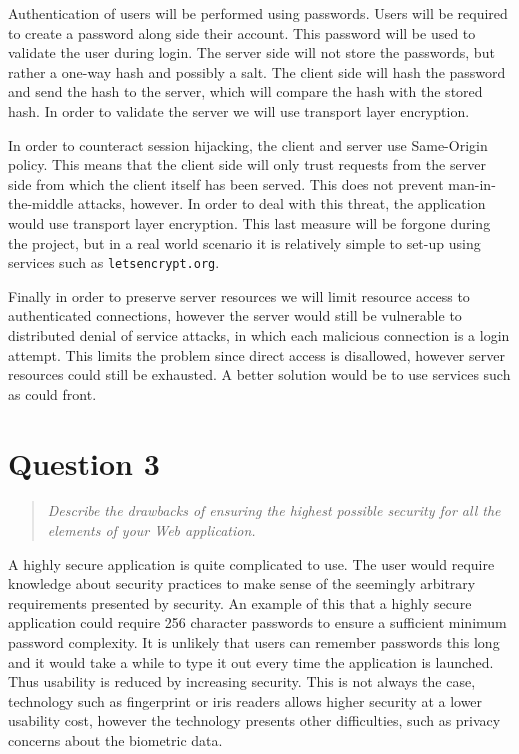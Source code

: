 \documentclass[10pt,a4paper]{report}
\begin{document}
Authentication of users will be performed using passwords. Users will be required to create a password along side their account. This password will be used to validate the user during login. The server side will not store the passwords, but rather a one-way hash and possibly a salt. The client side will hash the password and send the hash to the server, which will compare the hash with the stored hash. In order to validate the server we will use transport layer encryption.

In order to counteract session hijacking, the client and server use Same-Origin policy. This means that the client side will only trust requests from the server side from which the client itself has been served. This does not prevent man-in-the-middle attacks, however. In order to deal with this threat, the application would use transport layer encryption. This last measure will be forgone during the project, but in a real world scenario it is relatively simple to set-up using services such as \texttt{letsencrypt.org}.

Finally in order to preserve server resources we will limit resource access to authenticated connections, however the server would still be vulnerable to distributed denial of service attacks, in which each malicious connection is a login attempt. This limits the problem since direct access is disallowed, however server resources could still be exhausted. A better solution would be to use services such as could front.

\section{Question 3}
\begin{quote}
\textit{Describe the drawbacks of ensuring the highest possible security for all the elements of your Web application.}
\end{quote}

A highly secure application is quite complicated to use. The user would require knowledge about security practices to make sense of the seemingly arbitrary requirements presented by security. An example of this that a highly secure application could require 256 character passwords to ensure a sufficient minimum password complexity. It is unlikely that users can remember passwords this long and it would take a while to type it out every time the application is launched. Thus usability is reduced by increasing security. This is not always the case, technology such as fingerprint or iris readers allows higher security at a lower usability cost, however the technology presents other difficulties, such as privacy concerns about the biometric data. 
\end{document}
